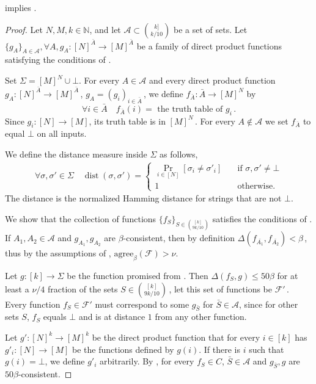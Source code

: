 \documentclass{toc}
\newcommand{\set}[1]{\{#1\}} %
\newcommand\f{f} %
\newcommand\setf{f} %
\newcommand{\g}{g} %
\newcommand\rest[1]{{\bar{#1}}}  %
\DeclareMathOperator{\dist}{dist} %
\newcommand{\diff}{\Delta} %
\begin{document}
\begin{claim}
 implies
.
\end{claim}
\begin{proof}
Let $N,M,k\in\mathbb{N}$, and let $\mathcal{A}\subset \binom{k]}{k/10}$ be a 
%
set %
of sets. Let $\set{\g_A}_{A\in\mathcal{A}}, \forall A, \g_A:[N]^{\rest{A}}\rightarrow [M]^{\rest{A}}$ be a family of direct product functions satisfying the conditions of .

Set $\Sigma = [M]^{N}\cup \bot$.
For every $A\in\mathcal{A}$ and every direct product function $\g_A:[N]^{\rest{A}}\rightarrow [M]^{\rest{A}}$\,, $\g_A = (\g_i)_{i\in\rest{A}}$\,, we define $\setf_{\rest{A}}:\rest{A}\rightarrow [M]^{N}$ by
\[ \forall i \in \rest{A} \quad \setf_{\rest{A}}(i) = \textrm{ the truth table of }\g_i\,. \]%
Since $g_i:[N]\rightarrow [M]$, its truth table is in $[M]^{N}$\,.
For every $A\notin \mathcal{A}$ we set $\f_{\rest{A}}$ to equal $\bot$ on all inputs.

We define the distance measure inside $\Sigma$ as follows, 
\begin{align*}
   \forall \sigma,\sigma'\in\Sigma \quad \dist(\sigma,\sigma') = 
   \begin{cases}
 \Pr_{i\in [N]}[\sigma_i \neq \sigma'_i] \quad &\textrm{if }\sigma,\sigma'\neq\bot\\
1 \quad &\textrm{otherwise.}
\end{cases} 
\end{align*}
The distance is the normalized Hamming distance for strings that are not $\bot$.

We show that the collection of functions $\set{\f_S}_{S\in\binom{[k]}{9k/10}}$ satisfies the conditions of . If  $A_1,A_2\in\mathcal{A}$ and $\g_{A_1},\g_{A_2}$ are $\beta$-consistent, then by definition $\Delta(\f_{\rest{A_1}},\f_{\rest{A_2}}) < \beta$\,, thus by the assumptions of ,   $\text{agree}_\beta(\mathcal{F})> \nu$.

Let $\g:[k]\rightarrow \Sigma$ be the function promised from . Then $\diff(\setf_S,\g) \leq 50\beta$ for at least a 
%
$\nu/4$ %
%
%
fraction  %
of the sets $S\in\binom{[k]}{9k/10}$\,, let this set of functions be $\mathcal{F}'$\,. Every function $\f_S\in \mathcal{F}'$  must correspond to some $\g_{\rest{S}}$ for $\rest{S}\in\mathcal{A}$, since for other sets $S$, $\f_S$ equals $\bot$  and is at distance $1$ from any other function. 

Let $\g':[N]^k\rightarrow[M]^k$ be the direct product function that for every $i\in [k]$ has $\g'_i:[N]\rightarrow[M]$ be the functions defined by $\g(i)$. If there is $i$ such that $\g(i)=\bot$, we define $\g'_i$ arbitrarily. By , for every $\f_S\in C$, $\rest{S}\in\mathcal{A}$ and $\g_{\rest{S}},\g$ are $50\beta$-consistent.
%
%
\end{proof}
\end{document}
